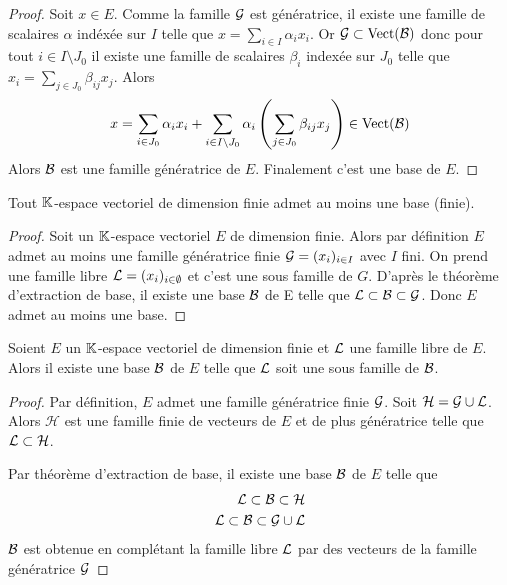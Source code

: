 \begin{proof}
  Soit $x \in E$. Comme la famille $\mathcal{G}$ est génératrice, il existe une famille de scalaires $\alpha$ indéxée sur $I$ telle que $x = \sum_{i \in I} \alpha_i x_i$. Or $\mathcal{G} \subset \operatorname{Vect}(\mathcal{B})$ donc pour tout $i \in I\setminus J_0$ il existe une famille de scalaires $\beta_i$ indexée sur $J_0$ telle que $x_i = \sum_{j \in J_0} \beta_{ij}x_j$. Alors
  \begin{equation}
    x= \sum_{i \in J_0} \alpha_i x_i + \sum_{i \in I\setminus J_0} \alpha_i \left(\sum_{j \in J_0} \beta_{ij}x_j \right) \in \operatorname{Vect}(\mathcal{B})
  \end{equation}
  Alors $\mathcal{B}$ est une famille génératrice de $E$. Finalement c'est une base de $E$.
\end{proof}

\begin{theo}
  Tout $\mathbb{K}$-espace vectoriel de dimension finie admet au moins une base (finie).
\end{theo}
\begin{proof}
  Soit un $\mathbb{K}$-espace vectoriel $E$ de dimension finie. Alors par définition $E$ admet au moins une famille génératrice finie $\mathcal{G}=(x_i)_{i \in I}$ avec $I$ fini. On prend une famille libre $\mathcal{L}=(x_i)_{i \in \emptyset}$ et c'est une sous famille de $G$. D'après le théorème d'extraction de base, il existe une base $\mathcal{B}$ de E telle que $\mathcal{L} \subset \mathcal{B} \subset \mathcal{G}$. Donc $E$ admet au moins une base.
\end{proof}

\begin{theo}
  Soient $E$ un $\mathbb{K}$-espace vectoriel de dimension finie et $\mathcal{L}$ une famille libre de $E$. Alors il existe une base $\mathcal{B}$ de $E$ telle que $\mathcal{L}$ soit une sous famille de $\mathcal{B}$.
\end{theo}
\begin{proof}
  Par définition, $E$ admet une famille génératrice finie $\mathcal{G}$. Soit $\mathcal{H}=\mathcal{G} \cup \mathcal{L}$. Alors $\mathcal{H}$ est une famille finie de vecteurs de $E$ et de plus génératrice telle que $\mathcal{L} \subset \mathcal{H}$.

  Par théorème d'extraction de base, il existe une base $\mathcal{B}$ de $E$ telle que
  \begin{align}
    \mathcal{L} \subset \mathcal{B} \subset \mathcal{H} \\
    \mathcal{L} \subset \mathcal{B} \subset \mathcal{G} \cup \mathcal{L}
  \end{align}
  $\mathcal{B}$ est obtenue en complétant la famille libre $\mathcal{L}$ par des vecteurs de la famille génératrice $\mathcal{G}$
\end{proof}


